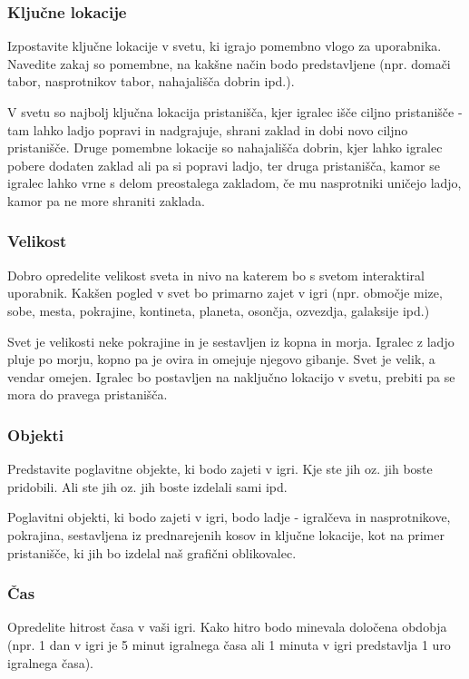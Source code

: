 \documentclass[a4paper]{article}
\begin{document}
\subsubsection{Ključne lokacije}
Izpostavite ključne lokacije v svetu, ki igrajo pomembno vlogo za uporabnika. Navedite zakaj so pomembne, na kakšne način bodo predstavljene (npr. domači tabor, nasprotnikov tabor, nahajališča dobrin  ipd.).

V svetu so najbolj ključna lokacija pristanišča, kjer igralec išče ciljno pristanišče - tam lahko ladjo popravi in nadgrajuje, shrani zaklad in dobi novo ciljno pristanišče. Druge pomembne lokacije so nahajališča dobrin, kjer lahko igralec pobere dodaten zaklad ali pa si popravi ladjo, ter druga pristanišča, kamor se igralec lahko vrne s delom preostalega zakladom, če mu nasprotniki uničejo ladjo, kamor pa ne more shraniti zaklada.

\subsubsection{Velikost}
Dobro opredelite velikost sveta in nivo na katerem bo s svetom interaktiral uporabnik. Kakšen pogled v svet bo primarno zajet v igri (npr. območje mize, sobe, mesta, pokrajine, kontineta, planeta, osončja, ozvezdja, galaksije ipd.)

Svet je velikosti neke pokrajine in je sestavljen iz kopna in morja. Igralec z ladjo pluje po morju, kopno pa je ovira in omejuje njegovo gibanje. Svet je velik, a vendar omejen. Igralec bo postavljen na naključno lokacijo v svetu, prebiti pa se mora do pravega pristanišča. 

\subsubsection{Objekti}
Predstavite poglavitne objekte, ki bodo zajeti v igri. Kje ste jih oz. jih boste pridobili. Ali ste jih oz. jih boste izdelali sami ipd.

Poglavitni objekti, ki bodo zajeti v igri, bodo ladje - igralčeva in nasprotnikove, pokrajina, sestavljena iz prednarejenih kosov in ključne lokacije, kot na primer pristanišče, ki jih bo izdelal naš grafični oblikovalec.

\subsubsection{Čas}
Opredelite hitrost časa v vaši igri. Kako hitro bodo minevala določena obdobja (npr. 1 dan v igri je 5 minut igralnega časa ali 1 minuta v igri predstavlja 1 uro igralnega časa).
\end{document}
